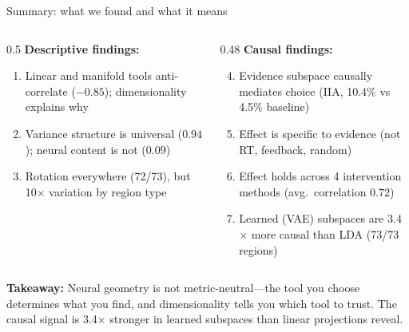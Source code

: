 \documentclass[aspectratio=169,11pt]{beamer}
\begin{document}
\begin{frame}{Summary: what we found and what it means}
\begin{columns}[T]
\begin{column}{0.5\textwidth}
\textbf{Descriptive findings:}
\begin{enumerate}
  \item Linear and manifold tools anti-correlate ($-0.85$); dimensionality explains why
  \item Variance structure is universal ($0.94$); neural content is not ($0.09$)
  \item Rotation everywhere (72/73), but 10$\times$ variation by region type
\end{enumerate}
\end{column}
\begin{column}{0.48\textwidth}
\textbf{Causal findings:}
\begin{enumerate}
  \setcounter{enumi}{3}
  \item Evidence subspace causally mediates choice (IIA, 10.4\% vs 4.5\% baseline)
  \item Effect is specific to evidence (not RT, feedback, random)
  \item Effect holds across 4 intervention methods (avg.\ correlation $0.72$)
  \item Learned (VAE) subspaces are 3.4$\times$ more causal than LDA (73/73 regions)
\end{enumerate}
\end{column}
\end{columns}

\vspace{0.5em}
{\small \textbf{Takeaway:} Neural geometry is not metric-neutral---the tool you choose determines what you find, and dimensionality tells you which tool to trust. The causal signal is 3.4$\times$ stronger in learned subspaces than linear projections reveal.}
\end{frame}


\begin{frame}[plain]
\vfill
\begin{center}
  \setlength{\fboxrule}{2.5pt}%
\end{center}
\vfill
\end{frame}
\end{document}
